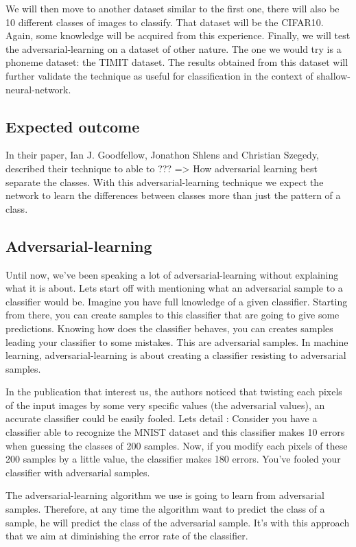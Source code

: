 		We will then move to another dataset similar to the first one, there will also be 10 different classes of images to classify. That dataset will be the CIFAR10\cite{CIFAR10_BITCHES}. Again, some knowledge will be acquired from this experience. Finally, we will test the adversarial-learning on a dataset of other nature. The one we would try is a phoneme dataset: the TIMIT dataset\cite{maybe...}. The results obtained from this dataset will further validate the technique as useful for classification in the context of shallow-neural-network.

	\subsection{Expected outcome}
		In their paper, Ian J. Goodfellow, Jonathon Shlens and Christian Szegedy, described their technique to able to ??? 
		=> How adversarial learning best separate the classes.
		With this adversarial-learning technique we expect the network to learn the differences between classes more than just the pattern of a class.


	\subsection{Adversarial-learning}
		Until now, we've been speaking a lot of adversarial-learning without explaining what it is about. Lets start off with mentioning what an adversarial sample to a classifier would be. Imagine you have full knowledge of a given classifier. Starting from there, you can create samples to this classifier that are going to give some predictions. Knowing how does the classifier behaves, you can creates samples leading your classifier to some mistakes. This are adversarial samples. In machine learning, adversarial-learning is about creating a classifier resisting to adversarial samples.

		In the publication that interest us\cite{goodfellow2014explaining}, the authors noticed that twisting each pixels of the input images by some very specific values (the adversarial values), an accurate classifier could be easily fooled. Lets detail : Consider you have a classifier able to recognize the MNIST dataset and this classifier makes 10 errors when guessing the classes of 200 samples. Now, if you modify each pixels of these 200 samples by a little value, the classifier makes 180 errors. You've fooled your classifier with adversarial samples.

		The adversarial-learning algorithm we use is going to learn from adversarial samples. Therefore, at any time the algorithm want to predict the class of a sample, he will predict the class of the adversarial sample. It's with this approach that we aim at diminishing the error rate of the classifier.


